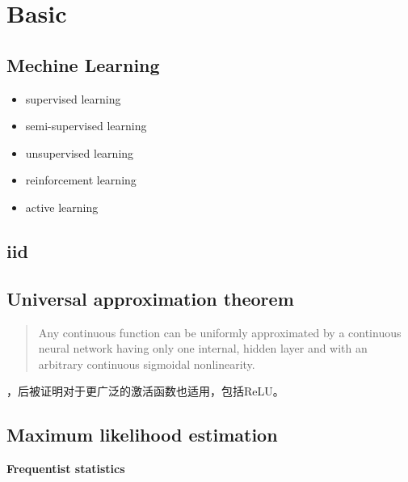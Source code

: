 \chapter{Basic}

\section{Mechine Learning}
\begin{itemize}
    \item supervised learning
    \item semi-supervised learning
    \item unsupervised learning
    \item reinforcement learning
    \item active learning
\end{itemize}

\section{iid}

\section{Universal approximation theorem}
\begin{quotation}
    Any continuous function can be uniformly approximated by a continuous neural network having only one
    internal, hidden layer and with an arbitrary continuous sigmoidal nonlinearity.\cite{Cybenko1989}
\end{quotation}
，后被证明对于更广泛的激活函数也适用\cite{Leshno1993}，包括ReLU。

\section{Maximum likelihood estimation}
\textbf{Frequentist statistics}


